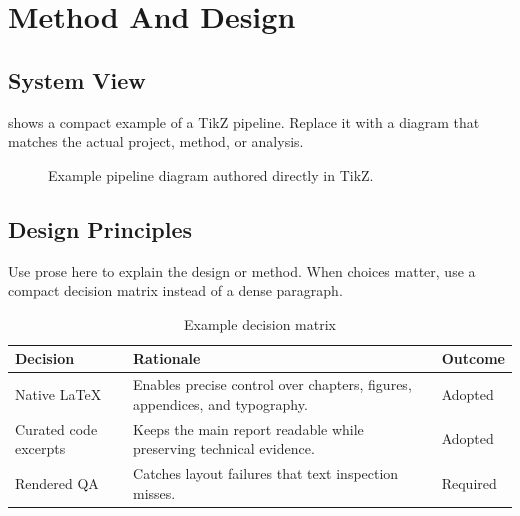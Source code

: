\chapter{Method And Design}

\section{System View}

 shows a compact example of a TikZ pipeline. Replace it with a diagram that matches the actual project, method, or analysis.

\begin{figure}[htbp]
\centering
{}
\caption{Example pipeline diagram authored directly in TikZ.}
\label{fig:pipeline}
\end{figure}

\section{Design Principles}

Use prose here to explain the design or method. When choices matter, use a compact decision matrix instead of a dense paragraph.

\begin{table}[htbp]
\centering
\caption{Example decision matrix}
\label{tab:decision-matrix}
\begin{tabularx}{\textwidth}{>{\raggedright\arraybackslash}p{}X>{\raggedright\arraybackslash}p{}}
\toprule
Decision & Rationale & Outcome \\
\midrule
Native LaTeX & Enables precise control over chapters, figures, appendices, and typography. & Adopted \\
Curated code excerpts & Keeps the main report readable while preserving technical evidence. & Adopted \\
Rendered QA & Catches layout failures that text inspection misses. & Required \\
\bottomrule
\end{tabularx}
\end{table}
